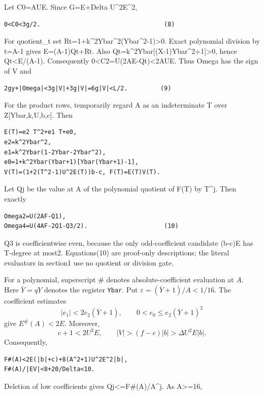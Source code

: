 Let C0=AUE. Since G=E+Delta U\^{}2E\^{}2,

\begin{verbatim}
0<C0<3g/2.                                  (8)
\end{verbatim}

For quotient\_t set Rt=1+k\^{}2Ybar\^{}2(Ybar\^{}2-1)\textgreater0.
Exact polynomial division by t=A-1 gives E=(A-1)Qt+Rt. Also
Qt=k\^{}2Ybar{[}(X-1)Ybar\^{}2+1{]}\textgreater0, hence
Qt\textless E/(A-1). Consequently 0\textless C2=U(2AE-Qt)\textless2AUE.
Thus Omega has the sign of V and

\begin{verbatim}
2gy+|Omega|<3g|V|+3g|V|=6g|V|<L/2.         (9)
\end{verbatim}

For the product rows, temporarily regard A as an indeterminate T over
Z{[}Ybar,k,U,b,c{]}. Then

\begin{verbatim}
E(T)=e2 T^2+e1 T+e0,
e2=k^2Ybar^2,
e1=k^2Ybar(1-2Ybar-2Ybar^2),
e0=1+k^2Ybar(Ybar+1)[Ybar(Ybar+1)-1],
V(T)=(1+2(T^2-1)U^2E(T))b-c, F(T)=E(T)V(T).
\end{verbatim}

Let Qj be the value at A of the polynomial quotient of F(T) by T\^{}j.
Then exactly

\begin{verbatim}
Omega2=U(2AF-Q1),
Omega4=U(4AF-2Q1-Q3/2).                     (10)
\end{verbatim}

Q3 is coefficientwise even, because the only odd-coefficient candidate
(b-c)E has T-degree at most2. Equations(10) are proof-only descriptions;
the literal evaluators in section1 use no quotient or division gate.

For a polynomial, superscript $\#$ denotes absolute-coefficient
evaluation at $A$. Here $\overline Y=qY$ denotes the register \texttt{Ybar}.
Put $\varepsilon=(\overline Y+1)/A<1/16$.
The coefficient estimates
\[
 |e_1|<2e_2(\overline Y+1),\qquad
 0<e_0\le e_2(\overline Y+1)^2
\]
give $E^{\#}(A)<2E$. Moreover,
\[
 c+1<2U^2E,\qquad |V|>(f-c)|b|>\Delta U^2E|b|.
\]
Consequently,

\begin{verbatim}
F#(A)<2E(|b|+c)+8(A^2+1)U^2E^2|b|,
F#(A)/|EV|<8+20/Delta<10.
\end{verbatim}

Deletion of low coefficients gives
\textbar Qj\textbar\textless=F\#(A)/A\^{}j. As A\textgreater=16,

